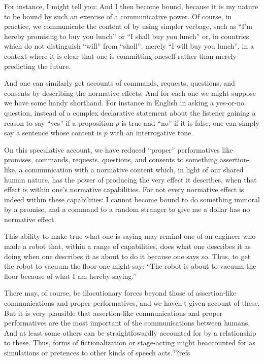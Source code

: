 For instance, I might tell you:
 And I then become bound, because it is my nature to be bound by such an exercise
of a communicative power. Of course, in practice, we communicate the content of  by using
simpler verbage, such as ``I'm hereby promising to buy you lunch'' or ``I shall buy you lunch'' or,
in countries which do not distinguish ``will'' from ``shall'', merely ``I will buy you lunch'', in a context
where it is clear that one is committing oneself rather than merely predicting the future. 

And one can similarly get accounts of commands, requests, questions, and consents by describing the normative effects.
And for each one we might suppose we have some handy shorthand. For instance in English in asking a yes-or-no question, 
instead of a complex declarative statement about the listener gaining a reason to say ``yes'' if a proposition $p$ is true
and ``no'' if it is false, one can simply say a sentence whose content is $p$ with an interrogative tone. 

On this speculative account, we have reduced ``proper'' performatives like promises, commands, requests, questions, and consents to something
assertion-like, a communication with a normative content which, in light of our shared human nature, has the
power of producing the very effect it describes, when that effect is within one's normative capabilities.
For not every normative effect is indeed within these capabilities: I cannot become bound to do something 
immoral by a promise, and a command to a random stranger to give me a dollar has no normative effect.
 
This ability to make true what one is saying may remind one of an engineer who made a robot that, within a 
range of capabilities, does what one describes it as doing when one describes it as about to do it because one says
so. Thus, to get the robot to vacuum the floor one might say: ``The robot is about to vacuum the floor because of
what I am hereby saying.''

There may, of course, be illocutionary forces beyond those of assertion-like communications and proper performatives, 
and we haven't given account of these. But it is very plausible that assertion-like communications and proper performatives are
the most important of the communications between humans. And at least some others can be straightfowardly accounted
for by a relationship to these. Thus, forms of
fictionalization or stage-acting might beaccounted for as simulations or
pretences to other kinds of speech acts.??refs

